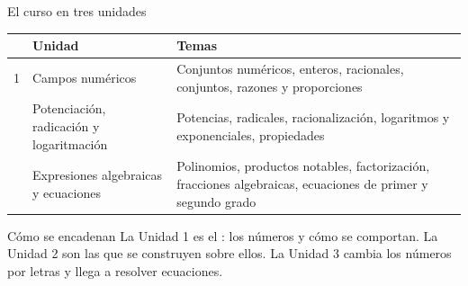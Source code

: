 \documentclass[aspectratio=169,10pt]{beamer}
\begin{document}
\begin{frame}{El curso en tres unidades}
  \scriptsize
  \begin{center}
  \begin{tabular}{@{}p{0.9cm}p{4.4cm}p{6.6cm}@{}}
    \toprule
    & \textbf{Unidad} & \textbf{Temas} \\
    \midrule
    1 & Campos numéricos &
      Conjuntos numéricos, enteros, racionales, conjuntos, razones y
      proporciones \\
    \addlinespace
    2 & Potenciación, radicación y logaritmación &
      Potencias, radicales, racionalización, logaritmos y exponenciales,
      propiedades \\
    \addlinespace
    3 & Expresiones algebraicas y ecuaciones &
      Polinomios, productos notables, factorización, fracciones algebraicas,
      ecuaciones de primer y segundo grado \\
    \bottomrule
  \end{tabular}
  \end{center}

  \vspace{0.12cm}
  \begin{alertblock}{Cómo se encadenan}
    \tiny
    La Unidad 1 es el : los números y cómo se comportan. La
    Unidad 2 son las  que se construyen sobre ellos.
    La Unidad 3 cambia los números por letras y llega a resolver ecuaciones.
  \end{alertblock}
\end{frame}
\end{document}
